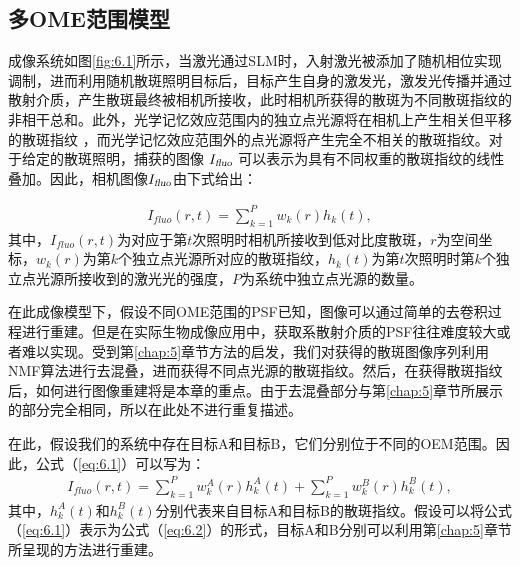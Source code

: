 \subsection{多OME范围模型}

成像系统如图\ref{fig:6.1}所示，当激光通过SLM时，入射激光被添加了随机相位实现调制，进而利用随机散斑照明目标后，目标产生自身的激发光，激发光传播并通过散射介质，产生散斑最终被相机所接收，此时相机所获得的散斑为不同散斑指纹的非相干总和。此外，光学记忆效应范围内的独立点光源将在相机上产生相关但平移的散斑指纹 \cite{Freund1988}，而光学记忆效应范围外的点光源将产生完全不相关的散斑指纹。对于给定的散斑照明，捕获的图像 $I_{\textsl{fluo}}$ 可以表示为具有不同权重的散斑指纹的线性叠加。因此，相机图像$I_{\textsl{fluo}}$由下式给出：

\begin{equation}
\begin{aligned}
I_{fluo}(r,t) = \sum^{P}_{k=1} w_{k}(r) h_{k}(t),
\label{eq:6.1}
\end{aligned}
\end{equation}
其中，$I_{fluo}(r,t)$为对应于第$t$次照明时相机所接收到低对比度散斑，$r$为空间坐标，$w_{k}(r)$为第$k$个独立点光源所对应的散斑指纹，$h_{k}(t)$为第$t$次照明时第$k$个独立点光源所接收到的激光光的强度，$P$为系统中独立点光源的数量。

在此成像模型下，假设不同OME范围的PSF已知，图像可以通过简单的去卷积过程进行重建。但是在实际生物成像应用中，获取系散射介质的PSF往往难度较大或者难以实现。受到第\ref{chap:5}章节方法的启发，我们对获得的散斑图像序列利用NMF算法进行去混叠，进而获得不同点光源的散斑指纹。然后，在获得散斑指纹后，如何进行图像重建将是本章的重点。由于去混叠部分与第\ref{chap:5}章节所展示的部分完全相同，所以在此处不进行重复描述。

在此，假设我们的系统中存在目标A和目标B，它们分别位于不同的OEM范围。因此，公式（\ref{eq:6.1}）可以写为：
\begin{equation}
\begin{aligned}
I_{fluo}(r,t) = \sum^{P}_{k=1} w_{k}^{A}(r) h_{k}^{A}(t)+\sum^{P}_{k=1} w_{k}^{B}(r) h_{k}^{B}(t),
\label{eq:6.2}
\end{aligned}
\end{equation}
其中，$h_{k}^{A}(t)$和$h_{k}^{B}(t)$分别代表来自目标A和目标B的散斑指纹。假设可以将公式（\ref{eq:6.1}）表示为公式（\ref{eq:6.2}）的形式，目标A和B分别可以利用第\ref{chap:5}章节所呈现的方法进行重建。

